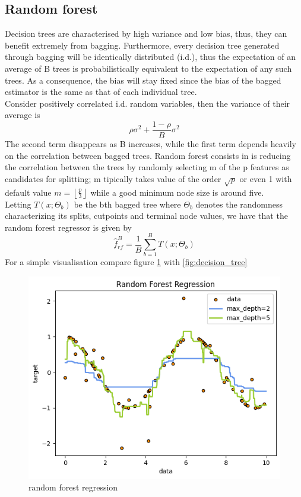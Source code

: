 \subsection{Random forest}
Decision trees are characterised by high variance and low bias, thus, they can benefit extremely from bagging. Furthermore, every decision tree generated through bagging will be identically distributed (i.d.), thus the expectation of an average of B trees is probabilistically equivalent to the expectation of any such trees. As a consequence, the bias will stay fixed since the bias of the bagged estimator is the same as that of each individual tree. 
\\
Consider positively correlated i.d. random variables, then the variance of their average is 
\begin{equation}
    \rho \sigma^2+\frac{1-\rho}{B}\sigma^2
\end{equation}
The second term disappears as B increases, while the first term depends heavily on the correlation between bagged trees. Random forest consists in is reducing the correlation between the trees by randomly selecting m of the p features as candidates for splitting; m tipically takes value of the order $\sqrt{p}$ or even 1 with default value $m=\left\lfloor \frac{p}{3} \right\rfloor$ while a good minimum node size is around five. 
\\
Letting $T(x;\Theta_b)$ be the bth bagged tree where $\Theta_b$ denotes the randomness characterizing its splits, cutpoints and terminal node values, we have that the random forest regressor is given by
\begin{equation}
    \hat{f}_{rf}^{B}=\frac{1}{B}\sum\limits_{b=1}^{B}T(x;\Theta_b)
\end{equation}
For a simple visualisation compare figure \ref{fig:random_forest} with \ref{fig:decision_tree}
\begin{figure}
    \includegraphics[width=\textwidth]{images/random_forest.png}
    \caption{random forest regression}
    \label{fig:random_forest}
\end{figure}


